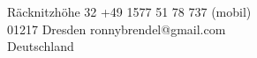 {\Huge \name}
\vspace{0.5cm}

R\"acknitzh\"ohe 32 \hfill +49 1577 51 78 737 (mobil)\\
01217 Dresden \hfill ronnybrendel@gmail.com\\
Deutschland \hfill

\vspace{0.6cm}
